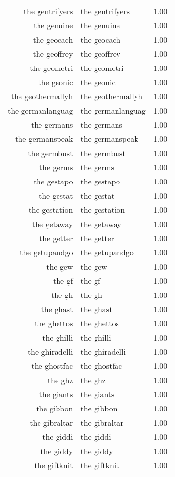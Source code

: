 \begin{table}[ht]
\begin{tabular}{rlr}
  the gentrifyers & the gentrifyers & 1.00 \\ 
  the genuine & the genuine & 1.00 \\ 
  the geocach & the geocach & 1.00 \\ 
  the geoffrey & the geoffrey & 1.00 \\ 
  the geometri & the geometri & 1.00 \\ 
  the geonic & the geonic & 1.00 \\ 
  the geothermallyh & the geothermallyh & 1.00 \\ 
  the germanlanguag & the germanlanguag & 1.00 \\ 
  the germans & the germans & 1.00 \\ 
  the germanspeak & the germanspeak & 1.00 \\ 
  the germbust & the germbust & 1.00 \\ 
  the germs & the germs & 1.00 \\ 
  the gestapo & the gestapo & 1.00 \\ 
  the gestat & the gestat & 1.00 \\ 
  the gestation & the gestation & 1.00 \\ 
  the getaway & the getaway & 1.00 \\ 
  the getter & the getter & 1.00 \\ 
  the getupandgo & the getupandgo & 1.00 \\ 
  the gew & the gew & 1.00 \\ 
  the gf & the gf & 1.00 \\ 
  the gh & the gh & 1.00 \\ 
  the ghast & the ghast & 1.00 \\ 
  the ghettos & the ghettos & 1.00 \\ 
  the ghilli & the ghilli & 1.00 \\ 
  the ghiradelli & the ghiradelli & 1.00 \\ 
  the ghostfac & the ghostfac & 1.00 \\ 
  the ghz & the ghz & 1.00 \\ 
  the giants & the giants & 1.00 \\ 
  the gibbon & the gibbon & 1.00 \\ 
  the gibraltar & the gibraltar & 1.00 \\ 
  the giddi & the giddi & 1.00 \\ 
  the giddy & the giddy & 1.00 \\ 
  the giftknit & the giftknit & 1.00 \\ 

\end{tabular}
\end{table}
